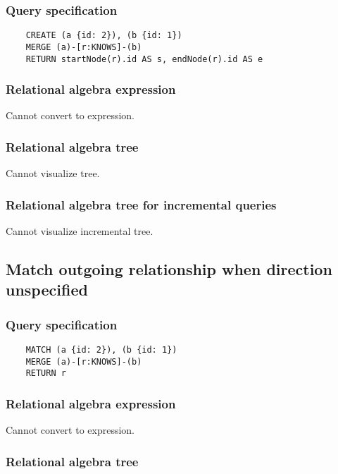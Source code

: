 	\subsubsection*{Query specification}

	\begin{lstlisting}
	CREATE (a {id: 2}), (b {id: 1})
	MERGE (a)-[r:KNOWS]-(b)
	RETURN startNode(r).id AS s, endNode(r).id AS e
	\end{lstlisting}


	\subsubsection*{Relational algebra expression}

	Cannot convert to expression.

	\subsubsection*{Relational algebra tree}

	Cannot visualize tree.

	\subsubsection*{Relational algebra tree for incremental queries}

	Cannot visualize incremental tree.
	\subsection{Match outgoing relationship when direction unspecified}

	\subsubsection*{Query specification}

	\begin{lstlisting}
	MATCH (a {id: 2}), (b {id: 1})
	MERGE (a)-[r:KNOWS]-(b)
	RETURN r
	\end{lstlisting}


	\subsubsection*{Relational algebra expression}

	Cannot convert to expression.

	\subsubsection*{Relational algebra tree}

